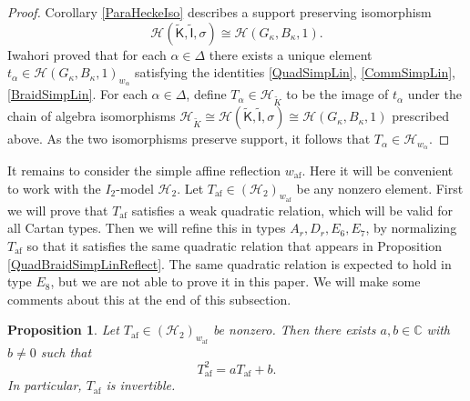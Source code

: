\documentclass[10pt, letterpaper]{amsart}
\theoremstyle{plain}
\newtheorem{Prop}[equation]{Proposition}
\theoremstyle{definition}
\numberwithin{equation}{section}
\newcommand{\Kt}{\widetilde{K}}
\newcommand{\af}{\mathrm{af}}
\newcommand{\Hcal}{\mathcal{H}}
\newcommand{\If}{\mathsf{I}}
\newcommand{\Kf}{\mathsf{K}}
\begin{document}
\begin{proof}
	Corollary \ref{ParaHeckeIso} describes a support preserving isomorphism 
	\begin{equation*}
		\Hcal(\widetilde{{\Kf}},\widetilde{{\If}},\sigma)\cong \Hcal(G_{\kappa},B_{\kappa},1).
	\end{equation*}
	Iwahori \cite{I64} proved that for each $\alpha\in\Delta$ there exists a unique element $t_{\alpha}\in \Hcal(G_{\kappa},B_{\kappa},1)_{w_{\alpha}}$ satisfying the identities \eqref{QuadSimpLin}, \eqref{CommSimpLin}, \eqref{BraidSimpLin}. For each $\alpha\in\Delta$, define $T_{\alpha}\in \Hcal_{\Kt}$ to be the image of $t_{\alpha}$ under the chain of algebra isomorphisms $\Hcal_{\Kt}\cong\Hcal(\widetilde{{\Kf}},\widetilde{{\If}},\sigma)\cong \Hcal(G_{\kappa},B_{\kappa},1)$ prescribed above. As the two isomorphisms preserve support, it follows that $T_{\alpha}\in \Hcal_{w_{\alpha}}$.
\end{proof}

It remains to consider the simple affine reflection $w_{\af}$. Here it will be convenient to work with the $I_2$-model $\Hcal_{2}$. Let $T_{\af}\in (\Hcal_{2})_{w_{\af}}$ be any nonzero element. First we will prove that $T_{\af}$ satisfies a weak quadratic relation, which will be valid for all Cartan types. Then we will refine this in types $A_r,D_r,E_{6}, E_{7}$, by normalizing $T_{\af}$ so that it satisfies the same quadratic relation that appears in Proposition \ref{QuadBraidSimpLinReflect}. The same quadratic relation is expected to hold in type $E_{8}$, but we are not able to prove it in this paper. We will make some comments about this at the end of this subsection.

\begin{Prop}\label{WeakQuadSimpAff}
	Let $T_{\af}\in (\Hcal_{2})_{w_{\af}}$ be nonzero. Then there exists $a,b\in\mathbb{C}$ with $b\neq 0$ such that
	\begin{equation*}
		T_{\af}^{2}=aT_{\af}+b.
	\end{equation*}
        In particular, $T_{\af}$ is invertible.
\end{Prop}
 
\end{document}
